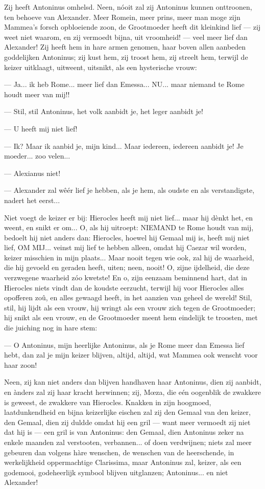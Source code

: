 \documentclass[a4paper, 12pt, oneside, dutch]{article}
\begin{document}
Zij heeft Antoninus omhelsd. Neen, nóoit zal zij Antoninus kunnen onttroonen, ten behoeve van Alexander. Meer Romein, meer prins, meer man moge zijn Mammea's forsch opbloeiende zoon, de Grootmoeder heeft dit kleinkind lief --- zij weet niet waarom, en zij vermoedt bijna, uit vroomheid! --- veel meer lief dan Alexander! Zij heeft hem in hare armen genomen, haar boven allen aanbeden goddelijken Antoninus; zij kust hem, zij troost hem, zij streelt hem, terwijl de keizer uitklaagt, uitweent, uitsnikt, als een hysterische vrouw:

--- Ja... ik heb Rome... meer lief dan Emessa... NU... maar niemand te Rome houdt meer van mij!!

--- Stil, stil Antoninus, het volk aanbidt je, het leger aanbidt je!

--- U heeft mij niet lief!

--- Ik? Maar ik aanbid je, mijn kind... Maar iedereen, iedereen aanbidt je! Je moeder... zoo velen...

--- Alexianus niet!

--- Alexander zal wêér lief je hebben, als je hem, als oudste en als verstandigste, nadert het eerst...

Niet voegt de keizer er bij: Hierocles heeft mij niet lief... maar hij dènkt het, en weent, en snikt er om... O, als hij uitroept: NIEMAND te Rome houdt van mij, bedoelt hij niet anders dan: Hierocles, hoewel hij Gemaal mij is, heeft mij niet lief, OM MIJ... veinst mij lief te hebben alleen, omdat hij Caezar wil worden, keizer misschien in mijn plaats... Maar nooit tegen wie ook, zal hij de waarheid, die hij gevoeld en geraden heeft, uiten; neen, nooit! O, zijne ijdelheid, die deze verzwegene waarheid zóo kwetste! En o, zijn eenzaam beminnend hart, dat in Hierocles niets vindt dan de koudste eerzucht, terwijl hij voor Hierocles alles opofferen zoû, en alles gewaagd heeft, in het aanzien van geheel de wereld! Stil, stil, hij lijdt als een vrouw, hij wringt als een vrouw zich tegen de Grootmoeder; hij snikt als een vrouw, en de Grootmoeder meent hem eindelijk te troosten, met die juiching nog in hare stem:

--- O Antoninus, mijn heerlijke Antoninus, als je Rome meer dan Emessa lief hebt, dan zal je mijn keizer blijven, altijd, altijd, wat Mammea ook wenscht voor haar zoon!

Neen, zij kan niet anders dan blijven handhaven haar Antoninus, dien zij aanbidt, en ànders zal zij haar kracht herwinnen; zij, Mœza, die eén oogenblik de zwakkere is geweest, de zwakkere van Hierocles. Knakken in zijn hoogmoed, laatdunkendheid en bijna keizerlijke eischen zal zij den Gemaal van den keizer, den Gemaal, dien zij duldde omdat hij een gril --- want meer vermoedt zij niet dat hij is --- een gril is van Antoninus: den Gemaal, dien Antoninus zeker na enkele maanden zal verstooten, verbannen... of doen verdwijnen; niets zal meer gebeuren dan volgens hàre wenschen, de wenschen van de heerschende, in werkelijkheid oppermachtige Clarissima, maar Antoninus zal, keizer, als een godemooi, godeheerlijk symbool blijven uitglanzen; Antoninus... en niet Alexander!
\end{document}
